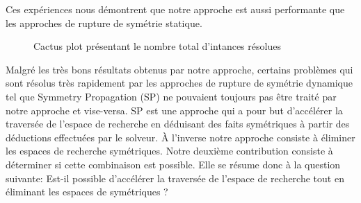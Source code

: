 Ces expériences nous démontrent que notre approche est aussi performante que les approches de rupture de symétrie statique.
\begin{figure}[!htbp]
	\centering
	\qquad
	\caption{Cactus plot  présentant le nombre total d'intances résolues}%
	\label{fig:frcactus}%
\end{figure}

Malgré les très bons résultats obtenus par notre approche, certains problèmes qui sont résolus très 
rapidement par les approches de rupture de symétrie dynamique tel que  Symmetry Propagation (SP) ne pouvaient toujours pas être traité par notre approche et vise-versa.
SP est une approche qui a pour but d'accélérer la traversée de l'espace de recherche en déduisant des faits symétriques à partir des déductions effectuées par le solveur.
À l'inverse notre approche consiste à éliminer les espaces de recherche 
symétriques. %
Notre deuxième contribution consiste à déterminer si cette combinaison est possible. Elle se résume donc à la question suivante:
Est-il possible d'accélérer la traversée de l'espace de recherche tout en éliminant les espaces de symétriques ?


